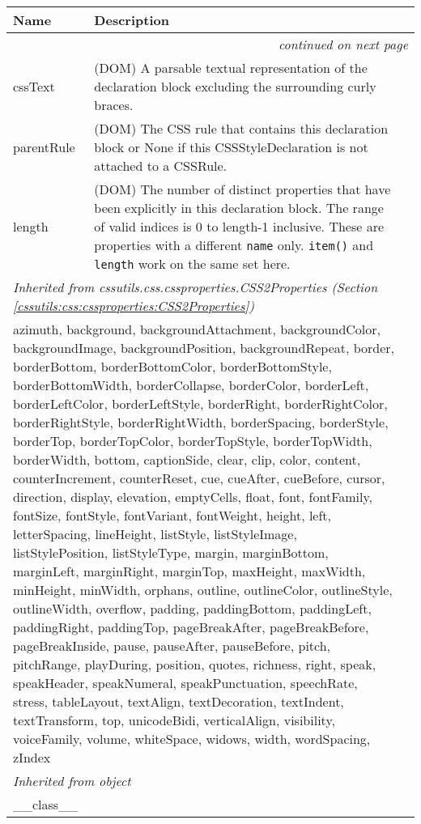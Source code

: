     \vspace{-1cm}
\hspace{\varindent}\begin{longtable}{|p{\varnamewidth}|p{\vardescrwidth}|l}
\cline{1-2}
\cline{1-2} \centering \textbf{Name} & \centering \textbf{Description}& \\
\cline{1-2}
\endhead\cline{1-2}\multicolumn{3}{r}{\small\textit{continued on next page}}\\\endfoot\cline{1-2}
\endlastfoot\raggedright c\-s\-s\-T\-e\-x\-t\- & \raggedright (DOM) A parsable textual representation of the declaration        block excluding the surrounding curly braces.&\\
\cline{1-2}
\raggedright p\-a\-r\-e\-n\-t\-R\-u\-l\-e\- & \raggedright (DOM) The CSS rule that contains this declaration block or        None if this CSSStyleDeclaration is not attached to a CSSRule.&\\
\cline{1-2}
\raggedright l\-e\-n\-g\-t\-h\- & \raggedright (DOM) The number of distinct properties that have been explicitly        in this declaration block. The range of valid indices is 0 to        length-1 inclusive. These are properties with a different \texttt{name}        only. \texttt{item()} and \texttt{length} work on the same set here.&\\
\cline{1-2}
\multicolumn{2}{|l|}{\textit{Inherited from cssutils.css.cssproperties.CSS2Properties \textit{(Section \ref{cssutils:css:cssproperties:CSS2Properties})}}}\\
\multicolumn{2}{|p{\varwidth}|}{\raggedright azimuth, background, backgroundAttachment, backgroundColor, backgroundImage, backgroundPosition, backgroundRepeat, border, borderBottom, borderBottomColor, borderBottomStyle, borderBottomWidth, borderCollapse, borderColor, borderLeft, borderLeftColor, borderLeftStyle, borderRight, borderRightColor, borderRightStyle, borderRightWidth, borderSpacing, borderStyle, borderTop, borderTopColor, borderTopStyle, borderTopWidth, borderWidth, bottom, captionSide, clear, clip, color, content, counterIncrement, counterReset, cue, cueAfter, cueBefore, cursor, direction, display, elevation, emptyCells, float, font, fontFamily, fontSize, fontStyle, fontVariant, fontWeight, height, left, letterSpacing, lineHeight, listStyle, listStyleImage, listStylePosition, listStyleType, margin, marginBottom, marginLeft, marginRight, marginTop, maxHeight, maxWidth, minHeight, minWidth, orphans, outline, outlineColor, outlineStyle, outlineWidth, overflow, padding, paddingBottom, paddingLeft, paddingRight, paddingTop, pageBreakAfter, pageBreakBefore, pageBreakInside, pause, pauseAfter, pauseBefore, pitch, pitchRange, playDuring, position, quotes, richness, right, speak, speakHeader, speakNumeral, speakPunctuation, speechRate, stress, tableLayout, textAlign, textDecoration, textIndent, textTransform, top, unicodeBidi, verticalAlign, visibility, voiceFamily, volume, whiteSpace, widows, width, wordSpacing, zIndex}\\
\cline{1-2}
\multicolumn{2}{|l|}{\textit{Inherited from object}}\\
\multicolumn{2}{|p{\varwidth}|}{\raggedright \_\_class\_\_}\\
\cline{1-2}
\end{longtable}

